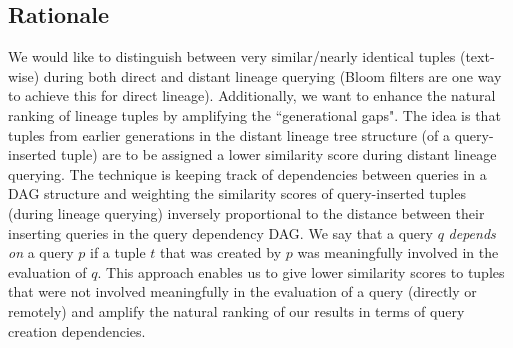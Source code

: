 \subsection{Rationale} We would like to distinguish between very similar/nearly identical tuples (text-wise) during both direct and distant lineage querying (Bloom filters are one way to achieve this for direct lineage). 
Additionally, we want to enhance the natural ranking of lineage tuples by amplifying the ``generational gaps". The idea is that tuples from earlier generations in the distant lineage tree structure (of a query-inserted tuple) are to be assigned a lower similarity score during distant lineage querying. 
The technique is keeping track of dependencies between queries in a DAG structure and weighting the similarity scores of query-inserted tuples (during lineage querying) inversely proportional to the distance between their inserting queries in the query dependency DAG. We say that a query $q$ \textit{depends on} a query $p$ if a tuple $t$ that was created by $p$ was meaningfully involved in the evaluation of $q$.
This approach enables us to give lower similarity scores to tuples that were not involved meaningfully in the evaluation of a query (directly or remotely) and amplify the natural ranking of our results in terms of query creation dependencies.\\

